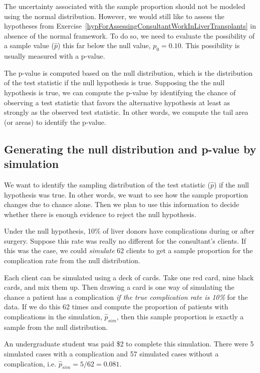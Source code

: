 The uncertainty associated with the sample proportion should not be modeled using the normal distribution. However, we would still like to assess the hypotheses from Exercise~\ref{hypForAssessingConsultantWorkInLiverTransplants} in absence of the normal framework. To do so, we need to evaluate the possibility of a sample value ($\hat{p}$) this far below the null value, $p_0=0.10$. This possibility is usually measured with a p-value.

The p-value is computed based on the null distribution, which is the distribution of the test statistic if the null hypothesis is true. Supposing the the null hypothesis is true, we can compute the p-value by identifying the chance of observing a test statistic that favors the alternative hypothesis at least as strongly as the observed test statistic. In other words, we compute the tail area (or areas) to identify the p-value.

\subsection{Generating the null distribution and p-value by simulation}
\label{generatingTheNullDistributionAndPValueBySimulationForOneProportion}

We want to identify the sampling distribution of the test statistic ($\hat{p}$) if the null hypothesis was true. In other words, we want to see how the sample proportion changes due to chance alone. Then we plan to use this information to decide whether there is enough evidence to reject the null hypothesis.

Under the null hypothesis, 10\% of liver donors have complications during or after surgery. Suppose this rate was really no different for the consultant's clients. If this was the case, we could \emph{simulate} 62 clients to get a sample proportion for the complication rate from the null distribution.

Each client can be simulated using a deck of cards. Take one red card, nine black cards, and mix them up. Then drawing a card is one way of simulating the chance a patient has a complication \emph{if the true complication rate is 10\%} for the data. If we do this 62 times and compute the proportion of patients with complications in the simulation, $\hat{p}_{sim}$, then this sample proportion is exactly a sample from the null distribution.

An undergraduate student was paid \$2 to complete this simulation. There were 5 simulated cases with a complication and 57 simulated cases without a complication, i.e. $\hat{p}_{sim} = 5/62 = 0.081$.

